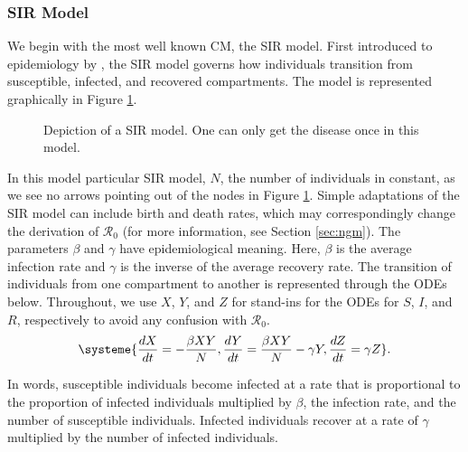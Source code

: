 \documentclass[12pt]{article}
\newcommand{\rr}{\ensuremath{\mathcal{R}_0}}
\begin{document}
\subsubsection{SIR Model}
\label{sec:sir-model}

We begin with the most well known CM, the SIR model.   First introduced to epidemiology by  \cite{Kermack700}, the SIR model governs how individuals transition from susceptible, infected, and recovered compartments.  The model is represented graphically in Figure \ref{fig::sir}. 

\begin{figure}[h]
\centering
{}
\caption{Depiction of a SIR model.  One can only get the disease once in this model.}\label{fig::sir}
\end{figure}
In this model particular  SIR model, $N$, the number of individuals in constant, as we see no arrows pointing out of the nodes in Figure \ref{fig::sir}. Simple adaptations of the SIR model can include birth and death rates, which may correspondingly change the derivation of $\rr$ (for more information, see Section \ref{sec:ngm}). The parameters  $\beta$ and $\gamma$ have epidemiological meaning.  Here, $\beta$ is the average infection rate and $\gamma$ is the inverse of the average recovery rate.  The transition of individuals from one compartment to another is represented through the ODEs below.  Throughout, we use $X$, $Y$, and $Z$ for stand-ins for the ODEs for $S$, $I$, and $R$, respectively to avoid any confusion with $\rr$.
\begin{align}
\systeme{\frac{dX}{dt} = -\frac{\beta XY}{N}, \frac{dY}{dt} = \frac{\beta XY}{N} - \gamma Y, \frac{dZ}{dt} = \gamma Z}. \label{eq::sir}
\end{align}

In words, susceptible individuals become infected at a rate that is proportional to the proportion of infected individuals multiplied by $\beta$, the infection rate, and the number of susceptible individuals.  Infected individuals recover at a rate of $\gamma$ multiplied by the number of infected individuals.
\end{document}
